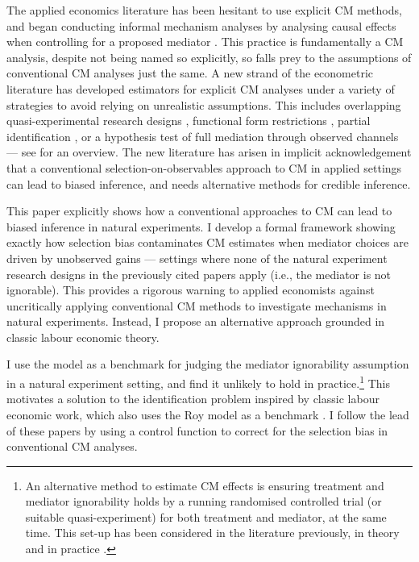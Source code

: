 The applied economics literature has been hesitant to use explicit CM methods, and began conducting informal mechanism analyses by analysing causal effects when controlling for a proposed mediator \citep{blackwell2024assumption}.
This practice is fundamentally a CM analysis, despite not being named so explicitly, so falls prey to the assumptions of conventional CM analyses just the same.
A new strand of the econometric literature has developed estimators for explicit CM analyses under a variety of strategies to avoid relying on unrealistic assumptions.
This includes overlapping quasi-experimental research designs \citep{deuchert2019direct,frolich2017direct}, functional form restrictions \citep{heckman2015econometric}, partial identification \citep{flores2009identification}, or a hypothesis test of full mediation through observed channels \citep{kwon2024testing} --- see \cite{huber2019review} for an overview.
The new literature has arisen in implicit acknowledgement that a conventional selection-on-observables approach to CM in applied settings can lead to biased inference, and needs alternative methods for credible inference.

This paper explicitly shows how a conventional approaches to CM can lead to biased inference in natural experiments.
I develop a formal framework showing exactly how selection bias contaminates CM estimates when mediator choices are driven by unobserved gains --- settings where none of the natural experiment research designs in the previously cited papers apply (i.e., the mediator is not ignorable).
This provides a rigorous warning to applied economists against uncritically applying conventional CM methods to investigate mechanisms in natural experiments.
Instead, I propose an alternative approach grounded in classic labour economic theory.

I use the \cite{roy1951some} model as a benchmark for judging the \cite{imai2010identification} mediator ignorability assumption in a natural experiment setting, and find it unlikely to hold in practice.\footnote{
    An alternative method to estimate CM effects is ensuring treatment and mediator ignorability holds by a running randomised controlled trial (or suitable quasi-experiment) for both treatment and mediator, at the same time.
    This set-up has been considered in the literature previously, in theory \citep{imai2013experimental,heckman2015econometric} and in practice \citep{ludwig2011mechanism,heckman2013understanding}.
}
This motivates a solution to the identification problem inspired by classic labour economic work, which also uses the Roy model as a benchmark \citep{heckman1979sample,heckman1990empirical}.
I follow the lead of these papers by using a control function to correct for the selection bias in conventional CM analyses.

